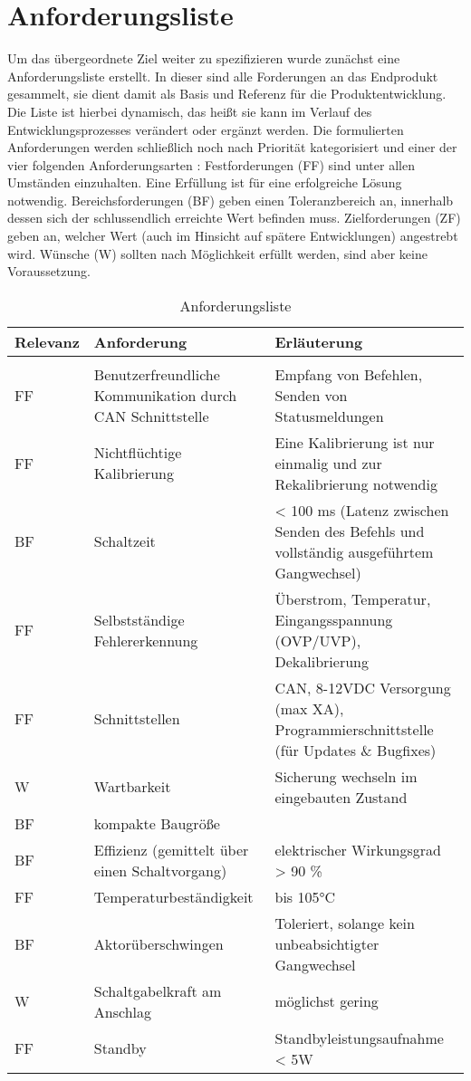 \section{Anforderungsliste}
Um das übergeordnete Ziel weiter zu spezifizieren wurde zunächst  eine Anforderungsliste erstellt. In dieser sind alle Forderungen an das Endprodukt gesammelt, sie dient damit als Basis und Referenz für die Produktentwicklung. Die Liste ist hierbei dynamisch, das heißt sie kann im Verlauf des Entwicklungsprozesses verändert oder ergänzt werden.  Die formulierten Anforderungen werden schließlich noch nach Priorität kategorisiert und einer der vier folgenden Anforderungsarten \cite[S. 189]{2013a}: Festforderungen (FF) sind unter allen Umständen einzuhalten. Eine Erfüllung ist für eine erfolgreiche Lösung notwendig.
Bereichsforderungen (BF) geben einen Toleranzbereich an, innerhalb dessen sich der schlussendlich erreichte Wert befinden muss.
Zielforderungen (ZF) geben an, welcher Wert (auch im Hinsicht auf spätere Entwicklungen) angestrebt wird.
Wünsche (W) sollten nach Möglichkeit erfüllt werden, sind aber keine Voraussetzung. 

\begin{table}[H]
	\centering
		\begin{tabular}{l|p{7cm}|p{7cm}}
			\textbf{Relevanz} & \textbf{Anforderung} & \textbf{Erläuterung} \\ \hline
			& &\\
			FF & Benutzerfreundliche Kommunikation durch CAN Schnittstelle & Empfang von Befehlen, Senden von Statusmeldungen \\ \hline
			FF & Nichtflüchtige Kalibrierung & Eine Kalibrierung ist nur einmalig und zur Rekalibrierung notwendig \\ \hline
			BF & Schaltzeit & < 100 ms (Latenz zwischen Senden des Befehls und vollständig ausgeführtem Gangwechsel) \\ \hline
			FF & Selbstständige Fehlererkennung & Überstrom, Temperatur, Eingangsspannung (OVP/UVP), Dekalibrierung \\ \hline
			FF & Schnittstellen & CAN, 8-12VDC Versorgung (max XA), Programmierschnittstelle (für Updates \& Bugfixes) \\ \hline
			W & Wartbarkeit & Sicherung wechseln im eingebauten Zustand \\ \hline
			BF & kompakte Baugröße & \\ \hline
			BF & Effizienz (gemittelt über einen Schaltvorgang) & elektrischer Wirkungsgrad > 90 \% \\ \hline
			FF & Temperaturbeständigkeit & bis 105°C \\ \hline
			BF & Aktorüberschwingen & Toleriert, solange kein unbeabsichtigter Gangwechsel \\ \hline
			W & Schaltgabelkraft am Anschlag & möglichst gering \\ \hline
			FF & Standby & Standbyleistungsaufnahme < 5W \\ \hline
		\end{tabular}
	\caption{Anforderungsliste}
	\label{tab:Anforderungsliste}
\end{table}

